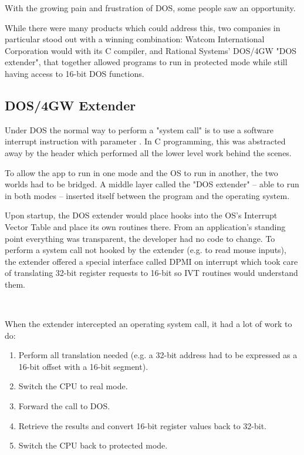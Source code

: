 \par
With the growing pain and frustration of DOS, some people saw an opportunity.\newpage 

While there were many products which could address this, two companies in particular stood out with a winning combination: Watcom International Corporation would with its C compiler, and Rational Systems' DOS/4GW "DOS extender", that together allowed programs to run in protected mode while still having access to 16-bit DOS functions.\\
\par


\subsection{DOS/4GW Extender}
Under DOS the normal way to perform a "system call" is to use a software interrupt instruction with parameter . In C programming, this was abstracted away by the header  which performed all the lower level work behind the scenes.\\
\par
{}
To allow the app to run in one mode and the OS to run in another, the two worlds had to be bridged. A middle layer called the "DOS extender" -- able to run in both modes -- inserted itself between the program and the operating system.\\

\par
{}
Upon startup, the DOS extender would place hooks into the OS's Interrupt Vector Table and place its own routines there. From an application's standing point everything was transparent, the developer had no code to change. To perform a system call not hooked by the extender (e.g.  to read mouse inputs), the extender offered a special interface called DPMI on interrupt  which took care of translating 32-bit register requests to 16-bit so IVT routines would understand them.\\
\par
{}\\
\par
When the extender intercepted an operating system call, it had a lot of work to do:
\begin{enumerate}
\item Perform all translation needed (e.g. a 32-bit address had to be expressed as a 16-bit offset with a 16-bit segment).
\item Switch the CPU to real mode.
\item Forward the call to DOS.
\item Retrieve the results and convert 16-bit register values back to 32-bit.
\item Switch the CPU back to protected mode.
\end{enumerate} 

